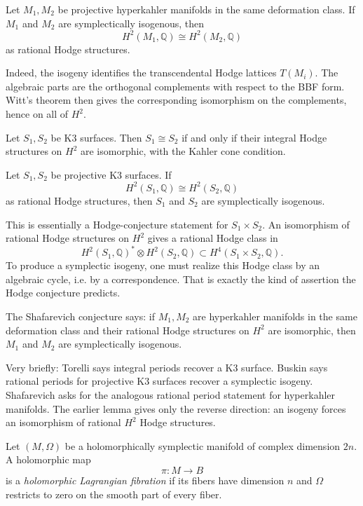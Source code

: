 \documentclass{book}
\begin{document}
\begin{lemma}
\label{lemma-isogeny-gives-h2-hodge-isom}
Let $M_1,M_2$ be projective hyperkahler
manifolds in the same deformation class.
If $M_1$ and $M_2$ are symplectically
isogenous, then
$$
H^2(M_1,\mathbb{Q})\cong
H^2(M_2,\mathbb{Q})
$$
as rational Hodge structures.
\end{lemma}

\noindent
Indeed, the isogeny identifies the
transcendental Hodge lattices $T(M_i)$.
The algebraic parts are the orthogonal
complements with respect to the BBF form.
Witt's theorem then gives the corresponding
isomorphism on the complements, hence on all
of $H^2$.

\begin{theorem}
\label{theorem-torelli-k3}
Let $S_1,S_2$ be K3 surfaces.
Then $S_1\cong S_2$ if and only if their
integral Hodge structures on $H^2$ are
isomorphic, with the Kahler cone condition.
\end{theorem}

\begin{theorem}[Buskin]
\label{theorem-buskin-k3-isogeny}
Let $S_1,S_2$ be projective K3 surfaces.
If
$$
H^2(S_1,\mathbb{Q})\cong
H^2(S_2,\mathbb{Q})
$$
as rational Hodge structures, then $S_1$ and
$S_2$ are symplectically isogenous.
\end{theorem}

\noindent
This is essentially a Hodge-conjecture
statement for $S_1\times S_2$.
An isomorphism of rational Hodge structures
on $H^2$ gives a rational Hodge class in
$$
H^2(S_1,\mathbb{Q})^*
\otimes H^2(S_2,\mathbb{Q})
\subset H^4(S_1\times S_2,\mathbb{Q}).
$$
To produce a symplectic isogeny, one must
realize this Hodge class by an algebraic
cycle, i.e. by a correspondence.
That is exactly the kind of assertion the
Hodge conjecture predicts.

The Shafarevich conjecture says:
if $M_1,M_2$ are hyperkahler manifolds in
the same deformation class and their rational
Hodge structures on $H^2$ are isomorphic,
then $M_1$ and $M_2$ are symplectically
isogenous.

\medskip
Very briefly: Torelli says integral periods
recover a K3 surface.
Buskin says rational periods for projective
K3 surfaces recover a symplectic isogeny.
Shafarevich asks for the analogous rational
period statement for hyperkahler manifolds.
The earlier lemma gives only the reverse
direction: an isogeny forces an isomorphism
of rational $H^2$ Hodge structures.

\begin{definition}
\label{definition-holomorphic-lagrangian-fib}
Let $(M,\Omega)$ be a holomorphically
symplectic manifold of complex dimension
$2n$.
A holomorphic map
$$
\pi:M\longrightarrow B
$$
is a {\it holomorphic Lagrangian fibration}
if its fibers have dimension $n$ and
$\Omega$ restricts to zero on the smooth
part of every fiber.
\end{definition}
\end{document}
